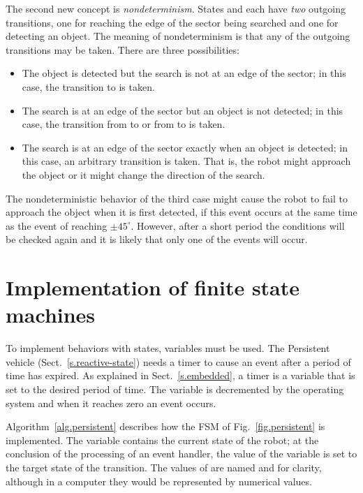 The second new concept is \emph{nondeterminism}. States  and  each have \emph{two} outgoing transitions, one for reaching the edge of the sector being searched and one for detecting an object. The meaning of nondeterminism is that any of the outgoing transitions may be taken. There are three possibilities:
\begin{itemize}
\item The object is detected but the search is not at an edge of the sector; in this case, the transition to  is taken.
\item The search is at an edge of the sector but an object is not detected; in this case, the transition from  to  or from  to  is taken.
\item The search is at an edge of the sector exactly when an object is detected; in this case, an arbitrary transition is taken. That is, the robot might approach the object or it might change the direction of the search.
\end{itemize}
The nondeterministic behavior of the third case might cause the robot to fail to approach the object when it is first detected, if this event occurs at the same time as the event of reaching $\pm45^\circ$. However, after a short period the conditions will be checked again and it is likely that only one of the events will occur.

\section{Implementation of finite state machines}\label{s.fsm-implementation}

To implement behaviors with states, variables must be used. The Persistent vehicle (Sect.~\ref{s.reactive-state}) needs a timer to cause an event after a period of time has expired. As explained in Sect.~\ref{s.embedded}, a timer is a variable that is set to the desired period of time. The variable is decremented by the operating system and when it reaches zero an event occurs.

Algorithm~\ref{alg.persistent} describes how the FSM of Fig.~\ref{fig.persistent} is implemented. The variable  contains the current state of the robot; at the conclusion of the processing of an event handler, the value of the variable is set to the target state of the transition. The values of  are named  and  for clarity, although in a computer they would be represented by numerical values.

